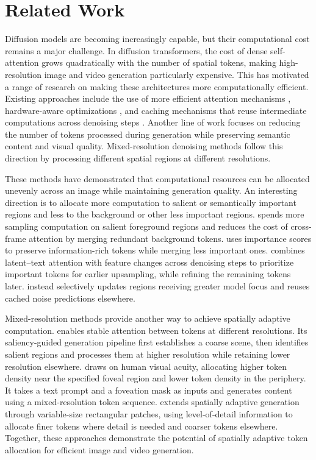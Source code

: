 \documentclass[11pt]{article}
\begin{document}
\section{Related Work}

Diffusion models are becoming increasingly capable, but their computational cost remains a major challenge. In diffusion transformers, the cost of dense self-attention grows quadratically with the number of spatial tokens, making high-resolution image and video generation particularly expensive. This has motivated a range of research on making these architectures more computationally efficient. Existing approaches include the use of more efficient attention mechanisms \cite{choromanski2020rethinking}\cite{katharopoulos2020transformers}\cite{li2025radial}\cite{wang2020linformer}, hardware-aware optimizations \cite{dao2022flashattention}\cite{xi2025sparse}, and caching mechanisms that reuse intermediate computations across denoising steps . Another line of work \cite{bolya2023token}\cite{kim2024token}\cite{lee2025local} focuses on reducing the number of tokens processed during generation while preserving semantic content and visual quality. Mixed-resolution denoising methods \cite{jeong2026training}\cite{tian2025training} follow this direction by processing different spatial regions at different resolutions.

These methods have demonstrated that computational resources can be allocated unevenly across an image while maintaining generation quality. An interesting direction is to allocate more computation to salient or semantically important regions and less to the background or other less important regions. \cite{kahatapitiya2024object} spends more sampling computation on salient foreground regions and reduces the cost of cross-frame attention by merging redundant background tokens. \cite{wu2025importance} uses importance scores to preserve information-rich tokens while merging less important ones. \cite{qin2026avits} combines latent–text attention with feature changes across denoising steps to prioritize important tokens for earlier upsampling, while refining the remaining tokens later. \cite{liu2026region} instead selectively updates regions receiving greater model focus and reuses cached noise predictions elsewhere.

Mixed-resolution methods provide another way to achieve spatially adaptive computation. \cite{wu2026phase} enables stable attention between tokens at different resolutions. Its saliency-guided generation pipeline first establishes a coarse scene, then identifies salient regions and processes them at higher resolution while retaining lower resolution elsewhere. \cite{chao2026foveated} draws on human visual acuity, allocating higher token density near the specified foveal region and lower token density in the periphery. It takes a text prompt and a foveation mask as inputs and generates content using a mixed-resolution token sequence. \cite{nakayama2026level} extends spatially adaptive generation through variable-size rectangular patches, using level-of-detail information to allocate finer tokens where detail is needed and coarser tokens elsewhere. Together, these approaches demonstrate the potential of spatially adaptive token allocation for efficient image and video generation.



\end{document}
